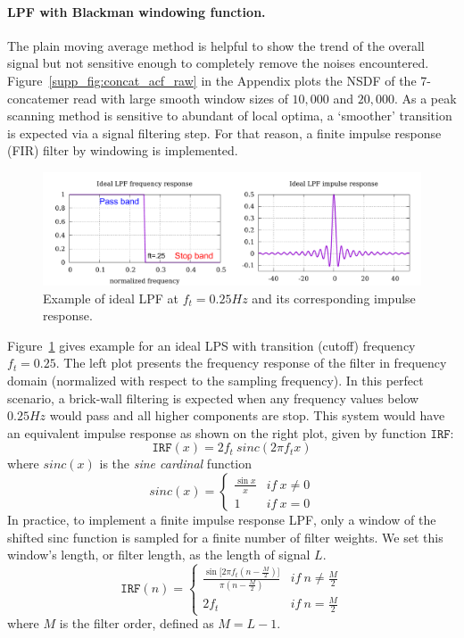 \paragraph{LPF with Blackman windowing function.}
The plain moving average method is helpful to show the trend of the overall signal but not sensitive enough to completely remove the noises encountered.
Figure~\ref{supp_fig:concat_acf_raw} in the Appendix plots the NSDF of the 7-concatemer read with large smooth window sizes of $10,000$ and $20,000$. 
As a peak scanning method is sensitive to abundant of local optima, a `smoother' transition is expected via a signal filtering step. 
For that reason, a finite impulse response (FIR) filter by windowing is implemented.
\begin{figure}[!hpt]
\centering
\includegraphics[width=\textwidth]{images/fir.pdf}
\caption{Example of ideal LPF at $f_t=0.25Hz$ and its corresponding impulse response.}
\label{fig:fir}
\end{figure}

Figure~\ref{fig:fir} gives example for an ideal LPS with transition (cutoff) frequency $f_t=0.25$. The left plot presents the frequency response of the filter in frequency domain (normalized with respect to the sampling frequency). In this perfect scenario, a brick-wall filtering is expected when any frequency values below $0.25Hz$ would pass and all higher components are stop.
This system would have an equivalent impulse response as shown on the right plot, given by function $\mathtt{IRF}$:
\[
\mathtt{IRF}(x) = 2f_{t}\ sinc(2\pi f_t x)
\]
where $sinc(x)$ is the \emph{sine cardinal} function
\[
sinc(x) = \left\{
\begin{array}{ll}
\frac{\displaystyle \sin{x}}{\displaystyle x}     &  if \: x \neq 0\\
1     &  if \: x=0
\end{array}
\right.
\]
In practice, to implement a finite impulse response LPF, only a window of the shifted sinc function is sampled for a finite number of filter weights. 
We set this window's length, or filter length, as the length of signal $L$. 
\begin{equation}
\label{eq:sinc}
\mathtt{IRF}(n) = \left\{
\begin{array}{ll}
\frac{\displaystyle \sin{[2\pi f_t (n-\frac{M}{2})}]}{\displaystyle \pi (n-\frac{M}{2})}     &  if \: n \neq \frac{M}{2}\\
2f_t     &  if \: n=\frac{M}{2}
\end{array}
\right.
\end{equation}
where $M$ is the filter order, defined as $M=L-1$.

